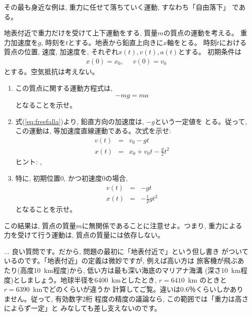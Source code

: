 その最も身近な例は, 重力に任せて落ちていく運動, すなわち「自由落下」
である。

\begin{q}\label{q:freefall0}
地表付近で重力だけを受けて上下運動をする, 質量$m$の質点の運動を考える。
重力加速度を$g$, 時刻を$t$とする。地表から鉛直上向きに$x$軸をとる。
時刻$t$における質点の位置, 速度, 加速度を, それぞれ$x(t), v(t), a(t)$とする。
初期条件は
\begin{eqnarray}x(0)=x_0,\,\,\,\,\,\,\,\,v(0)=v_0\end{eqnarray}
とする。空気抵抗は考えない。
\begin{enumerate}
\item この質点に関する運動方程式は, 
\begin{eqnarray}
-mg=ma\label{eq:freefalla}
\end{eqnarray}
となることを示せ。
\item 式(\ref{eq:freefalla})より, 鉛直方向の加速度は, $-g$という一定値を
とる。従って, この運動は, 等加速度直線運動である。次式を示せ:
\begin{eqnarray}
v(t)&=&v_0-gt\label{eq:freefallveq}\\
x(t)&=&x_0+v_0t-\frac{g}{2}t^2\label{eq:freefallxeq}
\end{eqnarray}
ヒント: , 
\item 特に, 初期位置0, かつ初速度0の場合, 
\begin{eqnarray}
v(t)&=&-gt\label{eq:freefallveq0}\\
x(t)&=&-\frac{1}{2}gt^2\label{eq:freefallxeq0}
\end{eqnarray}
となることを示せ。
\end{enumerate}
この結果は, 質点の質量$m$に無関係であることに注意せよ。つまり, 
重力による力を受けて行う運動は, 質点の質量には依存しない。
\end{q}
\mv

\begin{faq}{\small{}
... 良い質問です。だから, 問題の最初に「地表付近で」という但し書き
がついているのです。「地表付近」の定義は微妙ですが, 例えば高い方は
旅客機が飛ぶあたり(高度10~km程度)から, 低い方は最も深い海底のマリアナ海溝
(深さ10~km程度)としましょう。地球半径を6400~kmとしたとき, $r=6410$~km
のときと$r=6390$~kmでどのくらいが違うか
計算してご覧。違いは0.6％くらいしかありません。従って, 有効数字2桁
程度の精度の議論なら, この範囲では「重力は高さによらず一定」と
みなしても差し支えないのです。}\end{faq}
\mv

